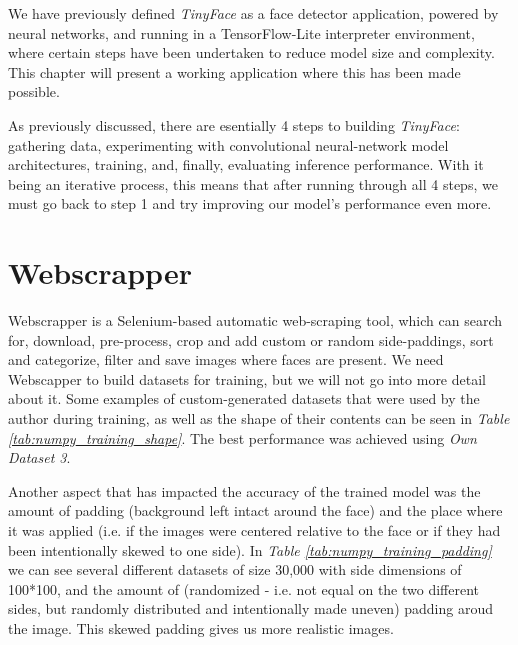 We have previously defined \textit{TinyFace} as a face detector application, powered by neural networks, and running in a TensorFlow-Lite interpreter environment, where certain steps have been undertaken to reduce model size and complexity. This chapter will present a working application where this has been made possible. \par
As previously discussed, there are esentially 4 steps to building \textit{TinyFace}: gathering data, experimenting with convolutional neural-network model architectures, training, and, finally, evaluating inference performance. With it being an iterative process, this means that after running through all 4 steps, we must go back to step 1 and try improving our model's performance even more. \par

\section{Webscrapper}

Webscrapper is a Selenium-based automatic web-scraping tool, which can search for, download, pre-process, crop and add custom or random side-paddings, sort and categorize, filter and save images where faces are present. We need Webscapper to build datasets for training, but we will not go into more detail about it. Some examples of custom-generated datasets that were used by the author during training, as well as the shape of their contents can be seen in \textit{Table \ref{tab:numpy_training_shape}}. The best performance was achieved using \textit{Own Dataset 3}. \par
Another aspect that has impacted the accuracy of the trained model was the amount of padding (background left intact around the face) and the place where it was applied (i.e. if the images were centered relative to the face or if they had been intentionally skewed to one side). In \textit{Table \ref{tab:numpy_training_padding}} we can see several different datasets of size 30,000 with side dimensions of 100*100, and the amount of (randomized - i.e. not equal on the two different sides, but randomly distributed and intentionally made uneven) padding aroud the image. This skewed padding gives us more realistic images.
